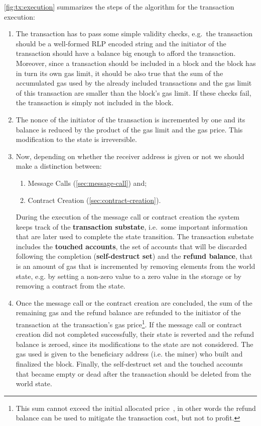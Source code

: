 \autoref{fig:tx:execution} summarizes the steps of the algorithm for the
transaction execution:
\begin{enumerate}
	\item The transaction has to pass some simple validity checks, e.g.\ the
	transaction should be a well-formed RLP encoded string and the initiator of
	the transaction should have a balance big enough to afford the transaction.
	Moreover, since a transaction should be included in a block and the block has
	in turn its own gas limit, it should be also true that the sum of the
	accumulated gas used by the already included transactions and the gas limit of
	this transaction are smaller than the block's gas limit. If these checks fail,
	the transaction is simply not included in the block.
	\item The nonce of the initiator of the transaction is incremented by one and
	its balance is reduced by the product of the gas limit and the gas price. This
	modification to the state is irreversible.
	\item Now, depending on whether the receiver address is given or not we should
	make a distinction between:
	\begin{enumerate}[label=\alph*.]
		\item Message Calls (\autoref{sec:message-call}) and;
		\item Contract Creation (\autoref{sec:contract-creation}).
	\end{enumerate}
	During the execution of the message call or contract creation the system keeps
	track of the \textbf{transaction substate}, i.e.\ some important information
	that are later used to complete the state transition. The transaction substate
	includes the \textbf{touched accounts}, the set of accounts that will be
	discarded following the completion (\textbf{self-destruct set}) and the
	\textbf{refund balance}, that is an amount of gas that is incremented by
	removing elements from the world state, e.g. by setting a non-zero value to a
	zero value in the storage or by removing a contract from the state.
	\item Once the message call or the contract creation are concluded, the sum of
	the remaining gas and the refund balance are refunded to the initiator of the
	transaction at the transaction's gas price\footnote{This sum cannot exceed the
	initial allocated price~\cite{wood2018ethereum}, in other words the refund
	balance can be used to mitigate the transaction cost, but not to profit.}. If
	the message call or contract creation did not completed successfully, their
	state is reverted and the refund balance is zeroed, since its modifications to
	the state are not considered. The gas used is given to the beneficiary address
	(i.e. the miner) who built and finalized the block. Finally, the self-destruct
	set and the touched accounts that became empty or dead after the transaction
	should be deleted from the world state.
\end{enumerate}



